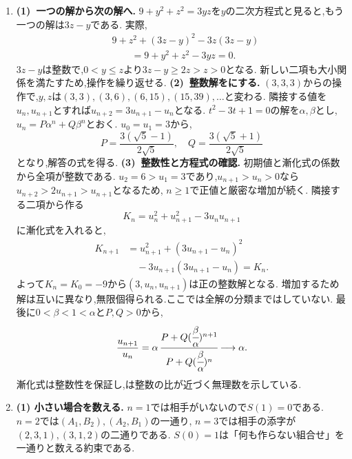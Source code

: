 \begin{enumerate}[label=\textbf{問\arabic*.},leftmargin=3.8em,format=\bookitemlink{practice-entrance}{solution}{problem}]
\[    \]
    最後は$a_0=0$と$\gcd(x,0)=x$を使った.
    例では$3040=2026+1014$,$2026=1014+1012$,$1014=1012+2$,$1012=506\cdot2$より$d=2$である.
    したがって$\gcd(a_{2026},a_{3040})=a_2=2$となる.
    巨大な項どうしの整除関係を,小さな添字の計算へ移せた.
  \item \textbf{(1)~一つの解から次の解へ.}
    $9+y^2+z^2=3yz$を$y$の二次方程式と見ると,もう一つの解は$3z-y$である.
    実際,
    \[
      \begin{aligned}
        &9+z^2+(3z-y)^2-3z(3z-y)\\
        &\qquad=9+y^2+z^2-3yz=0.
      \end{aligned}
    \]
    $3z-y$は整数で,$0<y\le z$より$3z-y\ge2z>z>0$となる.
    新しい二項も大小関係を満たすため,操作を繰り返せる.
    \smallskip\textbf{(2)~整数解をにする.}
    $(3,3,3)$からの操作で,$y,z$は$(3,3),(3,6),(6,15),(15,39),\ldots$と変わる.
    隣接する値を$u_n,u_{n+1}$とすれば$u_{n+2}=3u_{n+1}-u_n$となる.
    $t^2-3t+1=0$の解を$\alpha,\beta$とし,
    $u_n=P\alpha^n+Q\beta^n$とおく.
    $u_0=u_1=3$から,
    \[
      P=\frac{3(\sqrt5-1)}{2\sqrt5},\quad
      Q=\frac{3(\sqrt5+1)}{2\sqrt5}
    \]
    となり,解答の式を得る.
    \smallskip\textbf{(3)~整数性と方程式の確認.}
    初期値と漸化式の係数から全項が整数である.
    $u_2=6>u_1=3$であり,$u_{n+1}>u_n>0$なら$u_{n+2}>2u_{n+1}>u_{n+1}$となるため,
    $n\ge1$で正値と厳密な増加が続く.
    隣接する二項から作る
    \[
      K_n=u_n^2+u_{n+1}^2-3u_nu_{n+1}
    \]
    に漸化式を入れると,
    \[
      \begin{aligned}
        K_{n+1}&=u_{n+1}^2+(3u_{n+1}-u_n)^2\\
        &\quad-3u_{n+1}(3u_{n+1}-u_n)=K_n.
      \end{aligned}
    \]
    よって$K_n=K_0=-9$から$(3,u_n,u_{n+1})$は正の整数解となる.
    増加するため解は互いに異なり,無限個得られる.ここでは全解の分類まではしていない.
    最後に$0<\beta<1<\alpha$と$P,Q>0$から,
    \[
      \frac{u_{n+1}}{u_n}
      =\alpha\,\cfrac{P+Q(\cfrac\beta\alpha)^{n+1}}
      {P+Q(\cfrac\beta\alpha)^n}
      \longrightarrow\alpha.
    \]
    漸化式は整数性を保証し,は整数の比が近づく無理数を示している.
  \item \textbf{(1) 小さい場合を数える.}
    $n=1$では相手がいないので$S(1)=0$である.
    $n=2$では$(A_1,B_2),(A_2,B_1)$の一通り,
    $n=3$では相手の添字が$(2,3,1),(3,1,2)$の二通りである.
    $S(0)=1$は「何も作らない組合せ」を一通りと数える約束である.

\end{enumerate}
